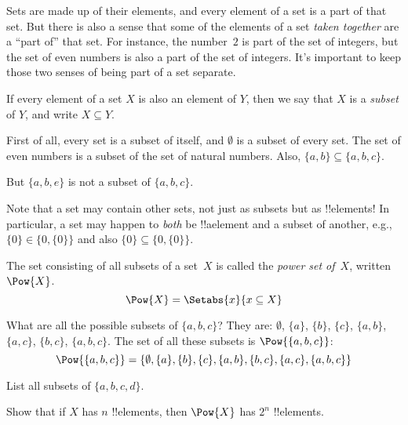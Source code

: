 \documentclass[../../../include/open-logic-section]{subfiles}
\begin{document}

\begin{explain}
Sets are made up of their elements, and every element of a set is a
part of that set. But there is also a sense that some of the elements
of a set \emph{taken together} are a ``part of'' that set. For
instance, the number~$2$ is part of the set of integers, but the set
of even numbers is also a part of the set of integers. It's important
to keep those two senses of being part of a set separate.
\end{explain}

\begin{defn}
If every element of a set $X$ is also an element of
    $Y$, then we say that $X$ is a \emph{subset} of $Y$, and write $X
    \subseteq Y$.
\end{defn}

\begin{ex}
First of all, every set is a subset of itself, and $\emptyset$ is a
subset of every set. The set of even numbers is a subset of the set of
natural numbers. Also, $\{ a, b \} \subseteq \{ a, b, c \}$.

But $\{ a, b, e \}$ is not a subset of $\{ a, b, c \}$.
\end{ex}

\begin{explain}
Note that a set may contain other sets, not just as subsets but as
!!{element}s!{} In particular, a set may happen to \emph{both} be 
!!a{element} and a subset of another, e.g., $\{0\} \in \{0, \{0\}\}$
and also $\{0\} \subseteq \{0, \{0\}\}$.
\end{explain}


\begin{defn}
The set consisting of all subsets of a set~$X$ is called the
\emph{power set of}~$X$, written $\Pow{X}$.
    \[\Pow{X} = \Setabs{x}{x \subseteq X} \]
\end{defn}

\begin{ex}
What are all the possible subsets of $\{ a, b, c \}$? They are:
$\emptyset$, $\{a \}$, $\{b\}$, $\{c\}$, $\{a, b\}$, $\{a, c\}$, $\{b,
c\}$, $\{a, b, c\}$. The set of all these subsets is
$\Pow{\{a,b,c\}}$:
\[
\Pow{\{ a, b, c \}} = \{\emptyset, \{a \}, \{b\}, \{c\}, \{a, b\},
\{b, c\}, \{a, c\}, \{a, b, c\}\}
\]
\end{ex}

\begin{prob}
List all subsets of $\{a, b, c, d\}$.
\end{prob}

\begin{prob}
Show that if $X$ has $n$ !!{element}s, then $\Pow{X}$ has $2^n$
!!{element}s.
\end{prob}
\end{document}
